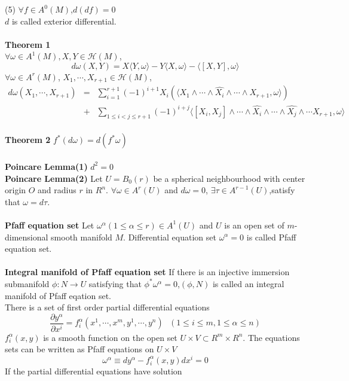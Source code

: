 \documentclass{article}
\begin{document}
(5) $\forall f \in A^0(M)$,$d(df)=0$\\
$d$ is called exterior differential.\\ \\
\textbf{Theorem 1}\\
$\forall \omega \in A^1(M),X,Y \in \mathcal{H}(M)$,
\[d\omega(X,Y) = X \langle Y,\omega \rangle -Y \langle X,\omega \rangle -\langle [X,Y],\omega \rangle \] 
$\forall \omega \in A^r(M)$, $X_1,\cdots,X_{r+1} \in \mathcal{H}(M)$,
\begin{eqnarray}
d\omega(X_1,\cdots,X_{r+1}) &=& \sum_{i=1}^{r+1}(-1)^{i+1} X_{i}(\langle X_1 \wedge \cdots \wedge \hat{X_i} \wedge \cdots \wedge X_{r+1},\omega \rangle) \nonumber \\
&+& \sum_{1 \leq i < j \leq r+1}(-1)^{i+j} \langle [X_i,X_j] \wedge \cdots \wedge \hat{X_i} \wedge \cdots \wedge \hat{X_j} \wedge \cdots X_{r+1},\omega \rangle \nonumber
\end{eqnarray}\\
\textbf{Theorem 2} $f^{*}(d\omega) = d(f^* \omega)$\\ \\
\textbf{Poincare Lemma(1)} $d^2=0$ \\
\textbf{Poincare Lemma(2)} Let $U=B_0(r)$ be a spherical neighbourhood with center origin $O$ and radius $r$ in $R^n$. $\forall \omega \in A^r(U)$ and $d\omega =0$, $\exists \tau \in A^{r-1}(U)$,satisfy that $\omega = d\tau$.\\ \\
\textbf{Pfaff equation set} Let $\omega^{\alpha}(1 \leq \alpha \leq r) \in A^1(U)$ and $U$ is an open set of $m$-dimensional smooth manifold $M$. Differential equation set $\omega^{\alpha} = 0$ is called Pfaff equation set.\\ \\
\textbf{Integral manifold of Pfaff equation set} If there is an injective immersion submanifold $\phi:N \to U$ satisfying that $\phi^{*} \omega^{\alpha} = 0$,$(\phi,N)$ is called an integral manifold of Pfaff eqation set.\\
There is a set of first order partial differential equations
\[\frac{\partial y^{\alpha}}{\partial x^i} = f^{\alpha}_{i}(x^1,\cdots,x^{m},y^1,\cdots,y^{n}) \ \ \ (1 \leq i \leq m,1 \leq \alpha \leq n)\]
$f^{\alpha}_{i}(x,y)$ is a smooth function on the open set $U \times V \subset R^m \times R^n$. The equations sets can be written as Pfaff equations on $U \times V$
\[\omega^{\alpha} \equiv dy^{\alpha} - f^{\alpha}_{i}(x,y)dx^i = 0\]
If the partial differential equations have solution
\end{document}
